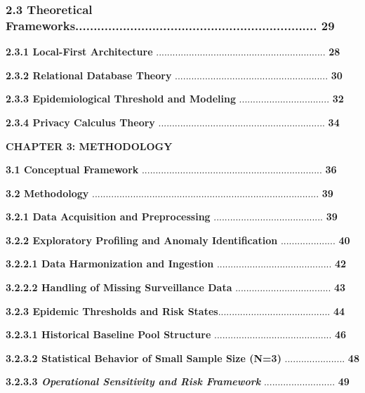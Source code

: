 \documentclass[
]{article}
\begin{document}
\subsubsection{\texorpdfstring{ \textbf{2.3 Theoretical
Frameworks}..................................................................
\textbf{29}}{ 2.3 Theoretical Frameworks.................................................................. 29}}\label{theoretical-frameworks..................................................................-29}

\textbf{2.3.1 Local-First Architecture}
..............................................................
\textbf{28}

\textbf{2.3.2 Relational Database Theory}
........................................................ \textbf{30}

\textbf{2.3.3 Epidemiological Threshold and Modeling}
................................. \textbf{32}

\textbf{2.3.4 Privacy Calculus Theory}
.............................................................
\textbf{34}

\textbf{CHAPTER 3: METHODOLOGY}

\textbf{3.1 Conceptual Framework}
..................................................................
\textbf{36}

\textbf{3.2 Methodology}
...................................................................................
\textbf{39}

\textbf{3.2.1 Data Acquisition and Preprocessing}
........................................ \textbf{39}

\textbf{3.2.2 Exploratory Profiling and Anomaly Identification}
.................... \textbf{40}

\textbf{3.2.2.1 Data Harmonization and Ingestion}
.......................................... \textbf{42}

\textbf{3.2.2.2 Handling of Missing Surveillance Data}
................................... \textbf{43}

\textbf{3.2.3 Epidemic Thresholds and Risk
States}......................................... \textbf{44}

\textbf{3.2.3.1 Historical Baseline Pool Structure}
........................................... \textbf{46}

\textbf{3.2.3.2 Statistical Behavior of Small Sample Size (N=3)}
...................... \textbf{48}

\textbf{3.2.3.3 \emph{Operational Sensitivity and Risk Framework}}
.......................... \textbf{49}
\end{document}
